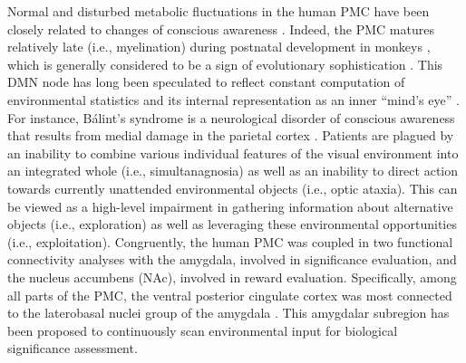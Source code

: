 \documentclass[10pt,letterpaper]{article}
\begin{document}
Normal and disturbed metabolic fluctuations in the
human PMC have been closely related to
changes of conscious awareness \citep{cavanna2006precuneus}.
Indeed,
the PMC matures relatively late (i.e., myelination) during postnatal development in monkeys
\citep{goldman1987development}, which is generally considered to
be a sign of evolutionary sophistication \citep{flechsig1920}.
%
This DMN node has long been speculated to
reflect constant computation of
environmental statistics and its internal representation
as an inner ``mind's eye'' \citep{cavanna2006precuneus, leech_pcc2014}.
For instance, B\'alint's syndrome is a neurological disorder of conscious
awareness that results from medial damage in the parietal cortex
\citep{balint1909seelenlahmung}.
Patients are plagued by an
inability to combine various individual features of the visual
environment into an integrated whole (i.e., simultanagnosia)
as well as an inability to direct action towards
currently unattended environmental objects
(i.e., optic ataxia).
This can be viewed as a high-level impairment in gathering
information about alternative objects (i.e., exploration) as well as
leveraging these environmental opportunities (i.e., exploitation).
Congruently,
the human PMC was coupled in two functional connectivity analyses
\citep{bzdok2015subspecialization}
with the amygdala, involved in significance evaluation, and
the nucleus accumbens (NAc), involved in reward evaluation.
Specifically, among all parts of the PMC,
the ventral posterior cingulate cortex was
most connected to the laterobasal
nuclei group of the amygdala
\citep{bzdok2015subspecialization}.
This amygdalar subregion has been proposed to
continuously scan environmental input
for biological significance assessment.
\end{document}
